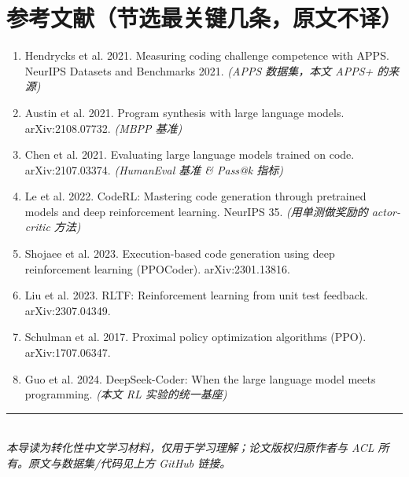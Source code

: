 \documentclass[11pt,UTF8,fontset=fandol]{ctexart}
\begin{document}
\section*{参考文献（节选最关键几条，原文不译）}
\begin{enumerate}[leftmargin=2em]
\item Hendrycks et al. 2021. Measuring coding challenge competence with APPS. NeurIPS Datasets and Benchmarks 2021. \textit{(APPS 数据集，本文 APPS+ 的来源)}
\item Austin et al. 2021. Program synthesis with large language models. arXiv:2108.07732. \textit{(MBPP 基准)}
\item Chen et al. 2021. Evaluating large language models trained on code. arXiv:2107.03374. \textit{(HumanEval 基准 \& Pass@k 指标)}
\item Le et al. 2022. CodeRL: Mastering code generation through pretrained models and deep reinforcement learning. NeurIPS 35. \textit{(用单测做奖励的 actor-critic 方法)}
\item Shojaee et al. 2023. Execution-based code generation using deep reinforcement learning (PPOCoder). arXiv:2301.13816.
\item Liu et al. 2023. RLTF: Reinforcement learning from unit test feedback. arXiv:2307.04349.
\item Schulman et al. 2017. Proximal policy optimization algorithms (PPO). arXiv:1707.06347.
\item Guo et al. 2024. DeepSeek-Coder: When the large language model meets programming. \textit{(本文 RL 实验的统一基座)}
\end{enumerate}

\vspace{1em}
\noindent\rule{\linewidth}{0.4pt}\\
\small\textit{本导读为转化性中文学习材料，仅用于学习理解；论文版权归原作者与 ACL 所有。原文与数据集/代码见上方 GitHub 链接。}
\end{document}
